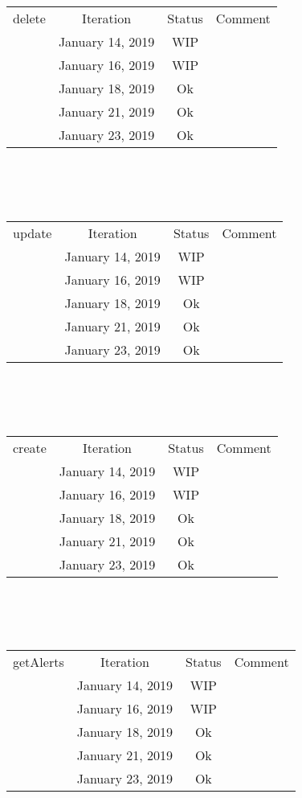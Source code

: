 \documentclass{scrreprt}
\begin{document}
	\begin{tabularx}{12cm}{X|c|c|c}
		delete & Iteration & Status & Comment  \\
		& January 14, 2019 & WIP & \\
		& January 16, 2019 & WIP & \\
		& January 18, 2019 & Ok & \\
		& January 21, 2019 & Ok & \\
		& January 23, 2019 & Ok & \\
		
	\end{tabularx}
	\\ \\ \\	
	\begin{tabularx}{12cm}{X|c|c|c}
		update & Iteration & Status & Comment  \\	
		& January 14, 2019 & WIP & \\
		& January 16, 2019 & WIP & \\
		& January 18, 2019 & Ok & \\
		& January 21, 2019 & Ok & \\
		& January 23, 2019 & Ok & \\
	\end{tabularx}
	\\ \\ \\	
	\begin{tabularx}{12cm}{X|c|c|c}
		create & Iteration & Status & Comment \\
		& January 14, 2019 & WIP & \\
		& January 16, 2019 & WIP & \\
		& January 18, 2019 & Ok & \\
		& January 21, 2019 & Ok & \\
		& January 23, 2019 & Ok & \\
	\end{tabularx}
	\\ \\ \\
	\begin{tabularx}{12cm}{X|c|c|c}
		getAlerts & Iteration & Status & Comment  \\
		& January 14, 2019 & WIP & \\
		& January 16, 2019 & WIP & \\
		& January 18, 2019 & Ok & \\
		& January 21, 2019 & Ok & \\
		& January 23, 2019 & Ok & \\
	\end{tabularx}
\end{document}
